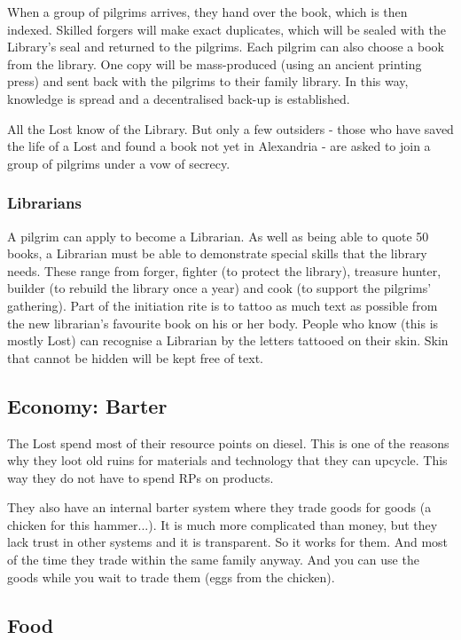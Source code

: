 When a group of pilgrims arrives, they hand over the book, which is then indexed. Skilled forgers will make exact duplicates, which will be sealed with the Library's seal and returned to the pilgrims. Each pilgrim can also choose a book from the library. One copy will be mass-produced (using an ancient printing press) and sent back with the pilgrims to their family library.
In this way, knowledge is spread and a decentralised back-up is established.

All the Lost know of the Library. But only a few outsiders - those who have saved the life of a Lost and found a book not yet in Alexandria - are asked to join a group of pilgrims under a vow of secrecy.

\subsubsection{Librarians}

A pilgrim can apply to become a Librarian. As well as being able to quote 50 books, a Librarian must be able to demonstrate special skills that the library needs. These range from forger, fighter (to protect the library), treasure hunter, builder (to rebuild the library once a year) and cook (to support the pilgrims' gathering).
Part of the initiation rite is to tattoo as much text as possible from the new librarian's favourite book on his or her body. People who know (this is mostly Lost) can recognise a Librarian by the letters tattooed on their skin.
Skin that cannot be hidden will be kept free of text.

\subsection{Economy: Barter}
\label{sec:Barter}
The Lost spend most of their resource points on diesel. This is one of the reasons why they loot old ruins for materials and technology that they can upcycle. This way they do not have to spend RPs on products.

They also have an internal barter system where they trade goods for goods (a chicken for this hammer...).
It is much more complicated than money, but they lack trust in other systems and it is transparent. So it works for them. And most of the time they trade within the same family anyway.
And you can use the goods while you wait to trade them (eggs from the chicken).

\subsection{Food}
\label{sec: lost food}

